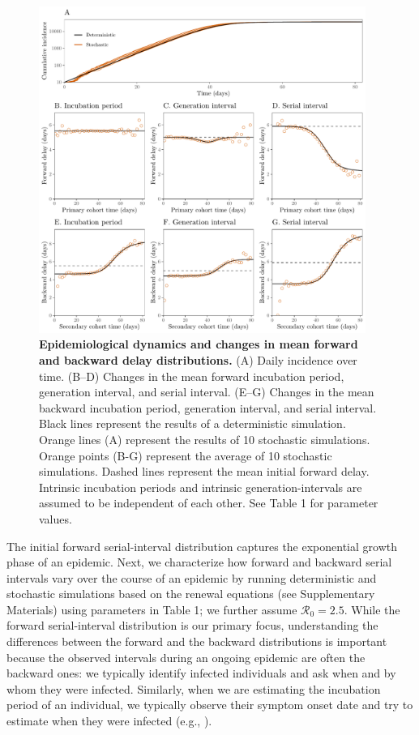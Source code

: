 \documentclass[12pt]{article}
\newcommand{\Rx}[1]{\ensuremath{{\mathcal R}_{#1}}\xspace}
\newcommand{\Ro}{\Rx{0}}
\begin{document}
\begin{figure}[!ht]
\begin{center}
\includegraphics[width=0.95\textwidth]{forward.pdf}
\caption{
\textbf{Epidemiological dynamics and changes in mean forward and backward delay distributions.}
(A) Daily incidence over time.
(B--D) Changes in the mean forward incubation period, generation interval, and serial interval.
(E--G) Changes in the mean backward incubation period, generation interval, and serial interval.
Black lines represent the results of a deterministic simulation.
Orange lines (A) represent the results of 10 stochastic simulations.
Orange points (B-G) represent the average of 10 stochastic simulations.
Dashed lines represent the mean initial forward delay.
Intrinsic incubation periods and intrinsic generation-intervals are assumed to be independent of each other.
See Table 1 for parameter values.
}
\label{fig:epi}
\end{center}
\end{figure}

The initial forward serial-interval distribution captures the exponential growth phase of an epidemic.
Next, we characterize how forward and backward serial intervals vary over the course of an epidemic by running deterministic and stochastic simulations based on the renewal equations (see Supplementary Materials) using parameters in Table 1;
we further assume $\Ro=2.5$.
While the forward serial-interval distribution is our primary focus, understanding the differences between the forward and the backward distributions is important because the observed intervals during an ongoing epidemic are often the backward ones:
we typically identify infected individuals and ask when and by whom they were infected.
Similarly, when we are estimating the incubation period of an individual, we typically observe their symptom onset date and try to estimate when they were infected (e.g., \cite{backer2020incubation}).
\end{document}
